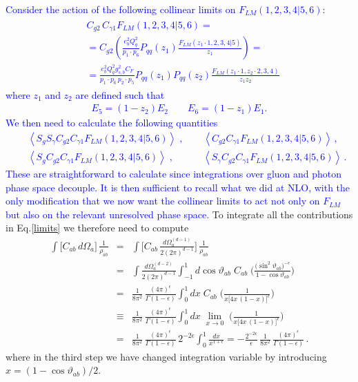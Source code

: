 \documentclass[12pt,a4paper]{article}
\newcommand{\nn}{\nonumber}
\newcommand{\eps}{\epsilon}
\newcommand{\beq}{\begin{eqnarray}}
\newcommand{\eeq}{\end{eqnarray}}
\begin{document}
{\textcolor{blue}{
Consider the action of the following collinear limits on $F_{LM}(1,2,3,4|5,6)$:
\beq
\begin{split}
	&C_{g2}\,C_{\gamma1}F_{LM}(1,2,3,4|5,6) = \\
	&=C_{g2}\left(\frac{e_b^2 Q_q^2}{p_1\cdot p_6}P_{qq}(z_1)\frac{F_{LM}\left(z_1\cdot1,2,3,4|5\right)}{z_1}\right)= \\
	&=\frac{e_b^2Q_q^2g_{s,b}^2C_F}{p_1 \cdot p_6 \,p_2\cdot p_5}P_{qq}(z_1)P_{qq}(z_2)\frac{F_{LM}(z_1\cdot1,z_2\cdot2,3,4)}{z_1 z_2}
\end{split}
\eeq
where $z_1$ and $z_2$ are defined such that
\beq
	E_5 = (1-z_2)E_2 \qquad E_6 = (1-z_1)E_1.
\eeq
We then need to calculate the following quantities
\beq
	&&\left \langle S_gS_{\gamma}C_{g2}C_{\gamma1}F_{LM}(1,2,3,4|5,6) \right \rangle  \; , \qquad \left \langle C_{g2}C_{\gamma1}F_{LM}(1,2,3,4|5,6) \right \rangle  \, ,
	\nn \\
	&&\left \langle S_gC_{g2}C_{\gamma1}F_{LM}(1,2,3,4|5,6) \right \rangle \; ,
	 \qquad \quad 
	  \left \langle S_{\gamma}C_{g2}C_{\gamma1}F_{LM}(1,2,3,4|5,6) \right \rangle \, .
	  \label{limits}
\eeq
These are straightforward to calculate since integrations over gluon and photon phase space decouple. It is then sufficient to recall what we did at NLO, with the only modification that we now want the collinear limits to act not only on $F_{LM}$ but also on the relevant unresolved phase space. 
}}
To integrate all the contributions in Eq.\eqref{limits} we therefore need to compute
\beq
\int \big[
C_{ab} \, d\Omega_a 
\big] \, \frac{1}{\rho_{ab}} &=&
\int \bigg[
C_{ab} \, \frac{d\Omega_a^{(d-1)}}{2 (2\pi)^{d-1}} 
\bigg] \, \frac{1}{\rho_{ab}}
\nn \\
&=&
\int  \frac{d\Omega_a^{(d-2)}}{2 (2\pi)^{d-1}} 
\int_{-1}^1
d\cos\vartheta_{ab}  \; 
C_{ab} \;  
\bigg(
\frac{ \big(\sin^2\vartheta_{ab}\big)^{-\eps}}{1-\cos\vartheta_{ab}}
\bigg)
\nn \\
&=&
\frac{1}{8\pi^2} \, \frac{(4\pi)^\eps}{\Gamma(1-\eps)}
\int_0^1
dx \; 
C_{ab} \;  
\bigg(
\frac{1}{x \big[4 x \, (1-x)\big]^\eps}
\bigg)
\nn \\
&\equiv&
\frac{1}{8\pi^2} \, \frac{(4\pi)^\eps}{\Gamma(1-\eps)}
\int_0^1
dx \; 
\lim_{x\rightarrow 0} \;  
\bigg(
\frac{1}{x \big[4 x \, (1-x)\big]^\eps}
\bigg)
\nn \\
&=&
\frac{1}{8\pi^2} \, \frac{(4\pi)^\eps}{\Gamma(1-\eps)} \, 2^{-2\eps}
\int_0^1
\frac{dx}{x^{1+\eps}}
= - \frac{2^{-2\eps}}{\eps} \, \frac{1}{8\pi^2} \, \frac{(4\pi)^\eps}{\Gamma(1-\eps)} \, .
\eeq
where in the third step we have changed integration variable by introducing $x= (1-\cos\vartheta_{ab})/2$.
\end{document}
